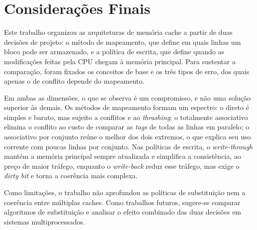 \documentclass[12pt]{article}
\begin{document}
\section{Considerações Finais}

Este trabalho organizou as arquiteturas de memória cache a partir de duas
decisões de projeto: o método de mapeamento, que define em quais linhas um
bloco pode ser armazenado, e a política de escrita, que define quando as
modificações feitas pela CPU chegam à memória principal. Para sustentar a
comparação, foram fixados os conceitos de base e os três tipos de erro,
dos quais apenas o de conflito depende do mapeamento.

Em ambas as dimensões, o que se observa é um compromisso, e não uma
solução superior às demais. Os métodos de mapeamento formam um espectro: o
direto é simples e barato, mas sujeito a conflitos e ao
\textit{thrashing}; o totalmente associativo elimina o conflito ao custo de
comparar as \textit{tags} de todas as linhas em paralelo; o associativo por
conjunto reúne o melhor dos dois extremos, o que explica seu uso corrente
com poucas linhas por conjunto. Nas políticas de escrita, o
\textit{write-through} mantém a memória principal sempre atualizada e
simplifica a consistência, ao preço de maior tráfego, enquanto o
\textit{write-back} reduz esse tráfego, mas exige o \textit{dirty bit} e
torna a coerência mais complexa.

Como limitações, o trabalho não aprofundou as políticas de substituição
nem a coerência entre múltiplas caches. Como trabalhos futuros, sugere-se 
comparar algoritmos de substituição e analisar o efeito combinado das duas
decisões em sistemas multiprocessados.



\end{document}
